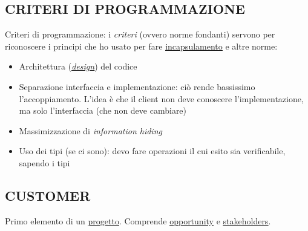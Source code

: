 		\subsection{CRITERI DI PROGRAMMAZIONE}		\label{criteriprog}
		Criteri di programmazione: %
		i \textit{criteri} (ovvero norme fondanti) servono per riconoscere i principi che ho usato per fare \underline{\hyperref[incapsulamento]{incapsulamento}} e altre norme:
		\begin{itemize}
			\item Architettura (\textit{\underline{\hyperref[progettazione]{design}}}) del codice
			\item Separazione interfaccia e implementazione: ciò rende bassissimo l'accoppiamento. L'idea è che il client non deve conoscere l'implementazione, ma solo l'interfaccia (che non deve cambiare)
			\item Massimizzazione di \textit{information hiding}
			\item Uso dei tipi (se ci sono): devo fare operazioni il cui esito sia verificabile, sapendo i tipi
		\end{itemize}


		\subsection{CUSTOMER}  \label{customer}
		Primo elemento di un \underline{\hyperref[progetto]{progetto}}. Comprende \underline{\hyperref[opportunity]{opportunity}} e \underline{\hyperref[stakeholder]{stakeholders}}.
